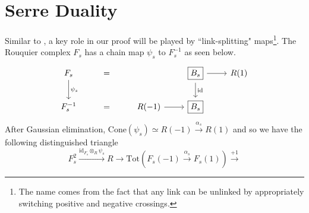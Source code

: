 \documentclass[10pt]{article}
\numberwithin{theorem}{section}
\theoremstyle{definition}
\newcommand{\id}{\mathrm{id}}
\newcommand{\paren}[1]{\left( #1 \right)}
\newcommand{\cone}{\mathrm{Cone}}
\newcommand{\0}{\ \raisebox{-2ex}{\begin{tikzpicture}[xscale=0.25,yscale=0.3,thick,baseline]
 \draw (0,0) -- (0,3); 
\end{tikzpicture}}}
\renewcommand{\1}{\ \raisebox{-2ex}{\begin{tikzpicture}[xscale=0.25,yscale=0.3,thick,baseline]
 \draw (0,0) -- (0,1);
 \draw (0,2) -- (0,3);
 \node[dot] at (0,1) {};
  \node[dot] at (0,2) {};
\end{tikzpicture}}}
\begin{document}
\section{Serre Duality}
\label{sect4}

Similar to \cite[Section 6]{GHMN19}, a key role in our proof will be played by ``link-splitting" maps\footnote{The name comes from the fact that any link can be unlinked by appropriately switching positive and negative crossings.}. The Rouquier complex $F_s$ has a chain map $\psi_s$ to $F_s^{-1}$ as seen below.
\[\begin{tikzcd}
F_s \arrow[d, "\psi_s"] & = & & \boxed{B_s} \arrow[d, "\id"]\arrow[r] & R(1) \\
F_s^{-1} & = & R(-1) \arrow[r] & \boxed{B_s}&
\end{tikzcd}
\]
After Gaussian elimination, $\cone(\psi_s)\simeq R(-1)\xrightarrow{\alpha_s}\boxed{R(1)}$ and so we have the following distinguished triangle
\begin{equation}
\label{spliteq}
    F_s^2\xrightarrow{\id_{F_s}\otimes_R \psi_s} R\to \mathrm{Tot}\paren{F_s(-1)\xrightarrow{\alpha_s} \boxed{F_s(1)}} \xrightarrow{+1}
\end{equation}
\end{document}
